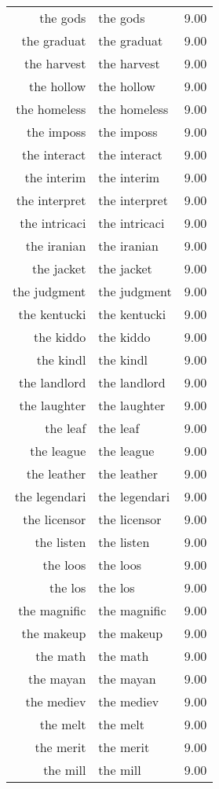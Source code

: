 \begin{table}[ht]
\begin{tabular}{rlr}
  the gods & the gods & 9.00 \\ 
  the graduat & the graduat & 9.00 \\ 
  the harvest & the harvest & 9.00 \\ 
  the hollow & the hollow & 9.00 \\ 
  the homeless & the homeless & 9.00 \\ 
  the imposs & the imposs & 9.00 \\ 
  the interact & the interact & 9.00 \\ 
  the interim & the interim & 9.00 \\ 
  the interpret & the interpret & 9.00 \\ 
  the intricaci & the intricaci & 9.00 \\ 
  the iranian & the iranian & 9.00 \\ 
  the jacket & the jacket & 9.00 \\ 
  the judgment & the judgment & 9.00 \\ 
  the kentucki & the kentucki & 9.00 \\ 
  the kiddo & the kiddo & 9.00 \\ 
  the kindl & the kindl & 9.00 \\ 
  the landlord & the landlord & 9.00 \\ 
  the laughter & the laughter & 9.00 \\ 
  the leaf & the leaf & 9.00 \\ 
  the league & the league & 9.00 \\ 
  the leather & the leather & 9.00 \\ 
  the legendari & the legendari & 9.00 \\ 
  the licensor & the licensor & 9.00 \\ 
  the listen & the listen & 9.00 \\ 
  the loos & the loos & 9.00 \\ 
  the los & the los & 9.00 \\ 
  the magnific & the magnific & 9.00 \\ 
  the makeup & the makeup & 9.00 \\ 
  the math & the math & 9.00 \\ 
  the mayan & the mayan & 9.00 \\ 
  the mediev & the mediev & 9.00 \\ 
  the melt & the melt & 9.00 \\ 
  the merit & the merit & 9.00 \\ 
  the mill & the mill & 9.00 \\ 

\end{tabular}
\end{table}

